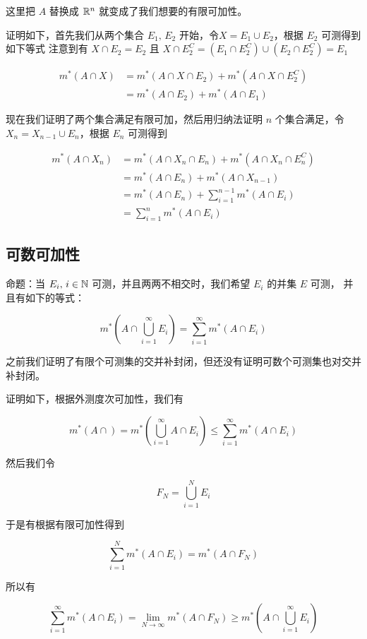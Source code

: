 这里把 $A$ 替换成 $\mathbb{R}^n$ 就变成了我们想要的有限可加性。

证明如下，首先我们从两个集合 $E_1, \, E_2$ 开始，令$X = E_1 \cup E_2$，根据 $E_2$ 可测得到如下等式
注意到有 $X \cap E_2 = E_2$ 且 $X \cap E_2^C = (E_1 \cap E_2^C) \cup (E_2 \cap E_2^C) = E_1$

\begin{align*}
    m^*(A \cap X) &= m^*(A \cap X \cap E_2) + m^*(A \cap X \cap E_2 ^C) \\
    &= m^*(A \cap E_2) + m^*(A \cap E_1)
\end{align*}

现在我们证明了两个集合满足有限可加，然后用归纳法证明 $n$ 个集合满足，令 $X_n = X_{n-1} \cup E_n$，根据 $E_n$ 可测得到


\begin{align*}
    m^*(A \cap X_n) &= m^*(A \cap X_n \cap E_n) + m^*(A \cap X_n \cap E_n ^C) \\
    &= m^*(A \cap E_n) + m^*(A \cap X_{n-1}) \\
    &= m^*(A \cap E_n) + \sum_{i=1}^{n-1}m^*(A \cap E_i) \\
    &= \sum_{i=1}^{n}m^*(A \cap E_i)
\end{align*}

\subsection{可数可加性}

命题：当 $E_i,\, i \in \mathbb{N}$ 可测，并且两两不相交时，我们希望 $E_i$ 的并集 $E$ 可测， 并且有如下的等式：

\[
    m^*(A \cap \bigcup_{i=1}^{\infty}E_i) = \sum_{i=1}^{\infty}m^*(A \cap E_i)
\]

之前我们证明了有限个可测集的交并补封闭，但还没有证明可数个可测集也对交并补封闭。


证明如下，根据外测度次可加性，我们有

\[
m^*(A \cap ) = m^*(\bigcup_{i =1}^{\infty}A \cap E_i) \le \sum_{i=1}^{\infty}m^*(A \cap E_i)
\]

然后我们令

\[
F_N = \bigcup_{i=1}^{N}E_i
\]

于是有根据有限可加性得到

\[
\sum_{i=1}^{N}m^*(A \cap E_i) = m^*(A \cap F_N)
\]

所以有

\[
\sum_{i=1}^{\infty}m^*(A \cap E_i) = \lim_{N \to \infty}m^*(A \cap F_N) \ge m^*(A \cap \bigcup_{i=1}^{\infty}E_i) 
\]

